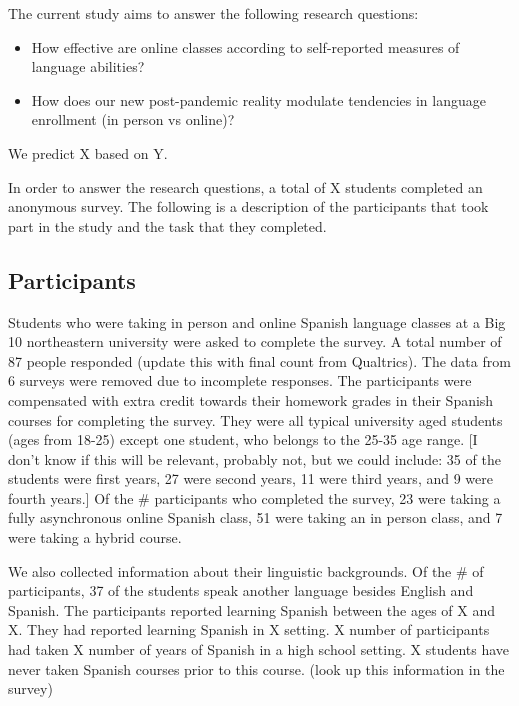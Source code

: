 \documentclass[
  man]{apa6}
\begin{document}
The current study aims to answer the following research questions:

\begin{itemize}
\item
  How effective are online classes according to self-reported measures of language abilities?
\item
  How does our new post-pandemic reality modulate tendencies in language enrollment (in person vs online)?
\end{itemize}

We predict X based on Y.

In order to answer the research questions, a total of X students completed an anonymous survey. The following is a description of the participants that took part in the study and the task that they completed.

\hypertarget{participants}{%
\subsection{Participants}\label{participants}}

Students who were taking in person and online Spanish language classes at a Big 10 northeastern university were asked to complete the survey.
A total number of 87 people responded (update this with final count from Qualtrics).
The data from 6 surveys were removed due to incomplete responses.
The participants were compensated with extra credit towards their homework grades in their Spanish courses for completing the survey.
They were all typical university aged students (ages from 18-25) except one student, who belongs to the 25-35 age range.
{[}I don't know if this will be relevant, probably not, but we could include: 35 of the students were first years, 27 were second years, 11 were third years, and 9 were fourth years.{]}
Of the \# participants who completed the survey, 23 were taking a fully asynchronous online Spanish class, 51 were taking an in person class, and 7 were taking a hybrid course.

We also collected information about their linguistic backgrounds.
Of the \# of participants, 37 of the students speak another language besides English and Spanish.
The participants reported learning Spanish between the ages of X and X.
They had reported learning Spanish in X setting.
X number of participants had taken X number of years of Spanish in a high school setting.
X students have never taken Spanish courses prior to this course. (look up this information in the survey)
\end{document}
